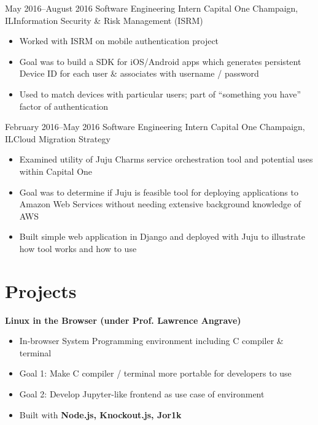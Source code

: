 \documentclass[10pt,a4paper,sans]{moderncv}        %
\begin{document}
\vspace{3pt}

\cventry
{May 2016--August 2016}
{\vspace{3pt}Software Engineering Intern}
{Capital One}
{Champaign, IL}{Information Security \& Risk Management (ISRM)}
{\vspace{3pt}
\begin{itemize}
  \item Worked with ISRM on mobile authentication project
  \item Goal was to build a SDK for iOS/Android apps which generates persistent
        Device ID for each user \& associates with username / password
  \item Used to match devices with particular users; part of ``something you have''
        factor of authentication
\end{itemize}}

\vspace{3pt}

\cventry
{February 2016--May 2016}
{\vspace{3pt}Software Engineering Intern}
{Capital One}
{Champaign, IL}{Cloud Migration Strategy}
{\vspace{3pt}
\begin{itemize}
  \item Examined utility of Juju Charms service orchestration tool and potential
        uses within Capital One
  \item Goal was to determine if Juju is feasible tool for deploying
        applications to Amazon Web Services without needing extensive background
        knowledge of AWS
  \item Built simple web application in Django and deployed with Juju to
        illustrate how tool works and how to use
\end{itemize}}

\section{Projects}

\vspace{5pt}
\textbf{Linux in the Browser (under Prof. Lawrence Angrave)}
\begin{itemize}
  \item In-browser System Programming environment including C compiler \& terminal
  \item Goal 1: Make C compiler / terminal more portable for developers to use
  \item Goal 2: Develop Jupyter-like frontend as use case of environment
  \item Built with \textbf{Node.js, Knockout.js, Jor1k}
\end{itemize}
\end{document}
